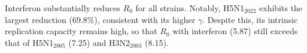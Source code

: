 \documentclass[12pt]{article}
\begin{document}
Interferon substantially reduces \(R_{0}\) for all strains. Notably, H5N1$_{2022}$ exhibits the largest reduction (69.8\%), consistent with its higher \(\gamma\). Despite this, its intrinsic replication capacity remains high, so that \(R_{0}\) with interferon (5.87) still exceeds that of H5N1$_{2005}$ (7.25) and H3N2$_{2003}$ (8.15).



\end{document}
